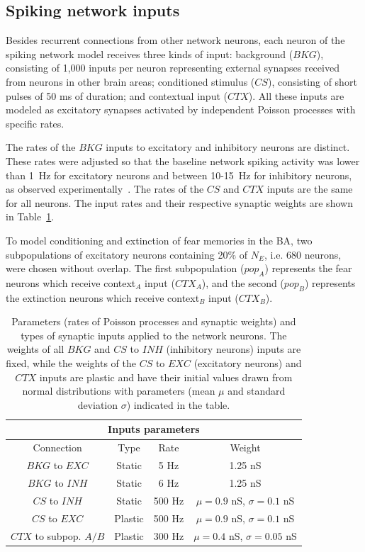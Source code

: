 \subsection*{Spiking network inputs}

Besides recurrent connections from other network neurons, each neuron of the spiking network model receives three kinds of input: background ($BKG$), consisting of 1,000 inputs per neuron representing external synapses received from neurons in other brain areas; conditioned stimulus ($CS$), consisting of short pulses of 50 ms of duration; and contextual input ($CTX$). All these inputs are modeled as excitatory synapses activated by independent Poisson processes with specific rates.

The rates of the $BKG$ inputs to excitatory and inhibitory neurons are distinct. These rates were adjusted so that the baseline network spiking activity was lower than 1~Hz for excitatory neurons and between 10-15~Hz for inhibitory neurons, as observed experimentally~\cite{sah2003amygdaloid}. The rates of the $CS$ and $CTX$ inputs are the same for all neurons. The input rates and their respective synaptic weights are shown in Table~\ref{tab: inputs}. 

To model conditioning and extinction of fear memories in the BA, two subpopulations of excitatory neurons containing 20\% of $N_{E}$, i.e. 680 neurons, were chosen without overlap. The first subpopulation (${pop}_A$) represents the fear neurons which receive context$_A$ input ($CTX_A$), and the second (${pop}_B$) represents the extinction neurons which receive context$_B$ input ($CTX_B$). 

\begin{table}[]
\caption{Parameters (rates of Poisson processes and synaptic weights) and types of synaptic inputs applied to the network neurons. The weights of all $BKG$ and $CS$ to $INH$ (inhibitory neurons) inputs are fixed, while the weights of the $CS$ to $EXC$ (excitatory neurons) and $CTX$ inputs are plastic and have their initial values drawn from normal distributions with parameters (mean $\mu$ and standard deviation $\sigma$) indicated in the table.}
\centering
\begin{tabular}{cccc}
\hline
\multicolumn{4}{c}{Inputs parameters}                   \\ \hline
Connection             & Type    & Rate   & Weight                             \\
$BKG$ to $EXC$         & Static  & 5 Hz   & 1.25 nS                            \\
$BKG$ to $INH$         & Static  & 6 Hz    & 1.25 nS                            \\
$CS$ to $INH$          & Static  & 500 Hz & $\mu = 0.9$ nS, $\sigma = 0.1$ nS  \\
$CS$ to $EXC$          & Plastic & 500 Hz & $\mu = 0.9$ nS, $\sigma = 0.1$ nS  \\
$CTX$ to subpop. $A/B$ & Plastic & 300 Hz & $\mu = 0.4$ nS, $\sigma = 0.05$ nS \\ \hline
\end{tabular}
\label{tab: inputs}
\end{table}

